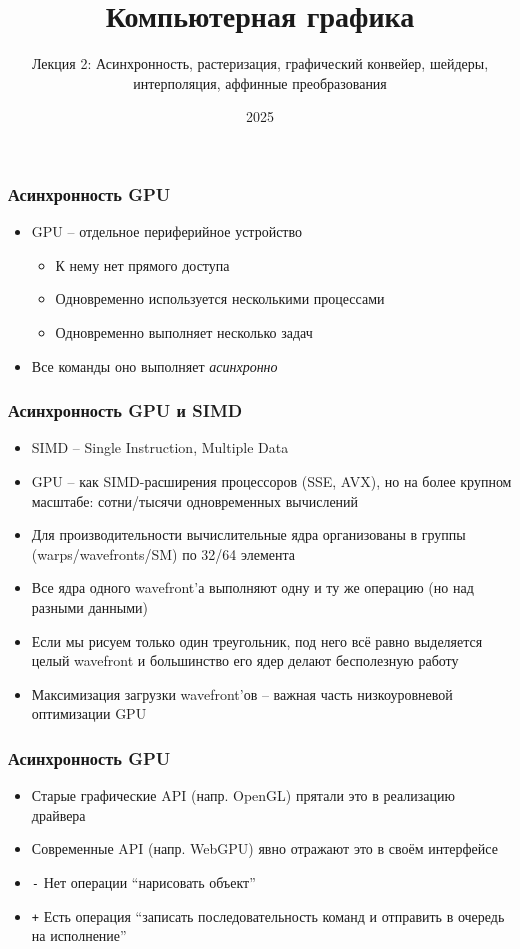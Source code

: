 \documentclass[10pt]{beamer}
\title{Компьютерная графика}
\subtitle{Лекция 2: Асинхронность, растеризация, графический конвейер, шейдеры, интерполяция, аффинные преобразования}
\date{2025}
\begin{document}
\frame{\titlepage}

\begin{frame}
\frametitle{Асинхронность GPU}
\begin{itemize}
\item GPU -- отдельное периферийное устройство
\pause
\begin{itemize}
\item К нему нет прямого доступа
\pause
\item Одновременно используется несколькими процессами
\pause
\item Одновременно выполняет несколько задач
\end{itemize}
\pause
\item Все команды оно выполняет \textit{асинхронно}
\end{itemize}
\end{frame}

\begin{frame}
\frametitle{Асинхронность GPU и SIMD}
\pause
\begin{itemize}
\item SIMD -- Single Instruction, Multiple Data
\pause
\item GPU -- как SIMD-расширения процессоров (SSE, AVX), но на более крупном масштабе: сотни/тысячи одновременных вычислений
\pause
\item Для производительности вычислительные ядра организованы в группы (warps/wavefronts/SM) по 32/64 элемента
\pause
\item Все ядра одного wavefront'а выполняют одну и ту же операцию (но над разными данными)
\pause
\item Если мы рисуем только один треугольник, под него всё равно выделяется целый wavefront и большинство его ядер делают бесполезную работу
\pause
\item Максимизация загрузки wavefront'ов -- важная часть низкоуровневой оптимизации GPU
\end{itemize}
\end{frame}

\begin{frame}
\frametitle{Асинхронность GPU}
\begin{itemize}
\item Старые графические API (напр. OpenGL) прятали это в реализацию драйвера
\pause
\item Современные API (напр. WebGPU) явно отражают это в своём интерфейсе
\pause
\item {\color{red}\texttt{-}} Нет операции ``нарисовать объект''
\item {\color{green}\texttt{+}} Есть операция ``записать последовательность команд и отправить в очередь на исполнение''
\end{itemize}
\end{frame}
\end{document}

